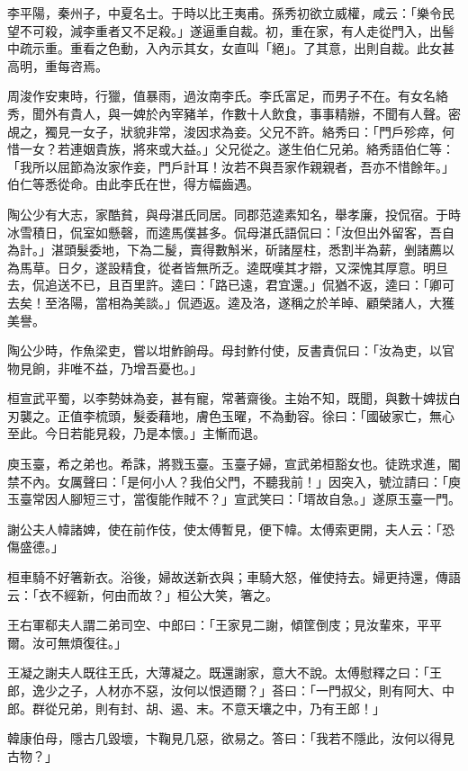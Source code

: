 李平陽，秦州子，中夏名士。于時以比王夷甫。孫秀初欲立威權，咸云：「樂令民望不可殺，減李重者又不足殺。」遂逼重自裁。初，重在家，有人走從門入，出髻中疏示重。重看之色動，入內示其女，女直叫「絕」。了其意，出則自裁。此女甚高明，重每咨焉。

周浚作安東時，行獵，值暴雨，過汝南李氏。李氏富足，而男子不在。有女名絡秀，聞外有貴人，與一婢於內宰豬羊，作數十人飲食，事事精辦，不聞有人聲。密覘之，獨見一女子，狀貌非常，浚因求為妾。父兄不許。絡秀曰：「門戶殄瘁，何惜一女？若連姻貴族，將來或大益。」父兄從之。遂生伯仁兄弟。絡秀語伯仁等：「我所以屈節為汝家作妾，門戶計耳！汝若不與吾家作親親者，吾亦不惜餘年。」伯仁等悉從命。由此李氏在世，得方幅齒遇。

陶公少有大志，家酷貧，與母湛氏同居。同郡范逵素知名，舉孝廉，投侃宿。于時冰雪積日，侃室如懸磬，而逵馬僕甚多。侃母湛氏語侃曰：「汝但出外留客，吾自為計。」湛頭髮委地，下為二髲，賣得數斛米，斫諸屋柱，悉割半為薪，剉諸薦以為馬草。日夕，遂設精食，從者皆無所乏。逵既嘆其才辯，又深愧其厚意。明旦去，侃追送不已，且百里許。逵曰：「路已遠，君宜還。」侃猶不返，逵曰：「卿可去矣！至洛陽，當相為美談。」侃迺返。逵及洛，遂稱之於羊晫、顧榮諸人，大獲美譽。

陶公少時，作魚梁吏，嘗以坩鮓餉母。母封鮓付使，反書責侃曰：「汝為吏，以官物見餉，非唯不益，乃增吾憂也。」

桓宣武平蜀，以李勢妹為妾，甚有寵，常著齋後。主始不知，既聞，與數十婢拔白刃襲之。正值李梳頭，髮委藉地，膚色玉曜，不為動容。徐曰：「國破家亡，無心至此。今日若能見殺，乃是本懷。」主慚而退。

庾玉臺，希之弟也。希誅，將戮玉臺。玉臺子婦，宣武弟桓豁女也。徒跣求進，閽禁不內。女厲聲曰：「是何小人？我伯父門，不聽我前！」因突入，號泣請曰：「庾玉臺常因人腳短三寸，當復能作賊不？」宣武笑曰：「壻故自急。」遂原玉臺一門。

謝公夫人幃諸婢，使在前作伎，使太傅暫見，便下幃。太傅索更開，夫人云：「恐傷盛德。」

桓車騎不好箸新衣。浴後，婦故送新衣與；車騎大怒，催使持去。婦更持還，傳語云：「衣不經新，何由而故？」桓公大笑，箸之。

王右軍郗夫人謂二弟司空、中郎曰：「王家見二謝，傾筐倒庋；見汝輩來，平平爾。汝可無煩復往。」

王凝之謝夫人既往王氏，大薄凝之。既還謝家，意大不說。太傅慰釋之曰：「王郎，逸少之子，人材亦不惡，汝何以恨迺爾？」荅曰：「一門叔父，則有阿大、中郎。群從兄弟，則有封、胡、遏、末。不意天壤之中，乃有王郎！」

韓康伯母，隱古几毀壞，卞鞠見几惡，欲易之。答曰：「我若不隱此，汝何以得見古物？」

